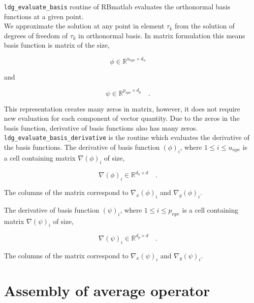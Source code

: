 \documentclass[a4paper,openany]{book}
\begin{document}
\verb|ldg_evaluate_basis| routine of RBmatlab evaluates the orthonormal basis functions at a given point.\\

We approximate the solution at any point in element $\tau_k$ from the solution of degrees of freedom of $\tau_k$ in orthonormal basis. In matrix formulation this means basis function is matrix of the size,

\begin{equation}\label{basis_func_velocity_rbmatlab}
\phi \in \mathbb{R}^{u_{npe} \times d_u}
\end{equation}

and

\begin{equation}\label{basis_func_pressure_rbmatlab}
\psi \in \mathbb{R}^{p_{npe} \times d_p} \quad \textrm{.}
\end{equation}

This representation creates many zeros in matrix, however, it does not require new evaluation for each component of vector quantity. Due to the zeros in the basis function, derivative of basis functions also has many zeros.\\

\verb|ldg_evaluate_basis_derivative| is the routine which evaluates the derivative of the basis functions. The derivative of basis function $(\phi)_{i}$, where $1 \leq i \leq u_{npe}$ is a cell containing matrix $\nabla (\phi)_{i}$ of size,

\begin{equation}\label{basis_func_derivative_velocity_rbmatlab}
\nabla (\phi)_{i} \in \mathbb{R}^{{d_u} \times d} \quad \textrm{.}
\end{equation}

The columns of the matrix correspond to $\nabla_x (\phi)_{i}$ and $\nabla_y (\phi)_{i}$.

The derivative of basis function $(\psi)_{i}$, where $1 \leq i \leq p_{npe}$ is a cell containing matrix $\nabla (\psi)_{i}$ of size,

\begin{equation}\label{basis_func_derivative_pressure_rbmatlab}
\nabla (\psi)_{i} \in \mathbb{R}^{{d_p} \times d} \quad \textrm{.}
\end{equation}

The columns of the matrix correspond to $\nabla_x (\psi)_{i}$ and $\nabla_y (\psi)_{i}$.

\section{Assembly of average operator}
\end{document}
